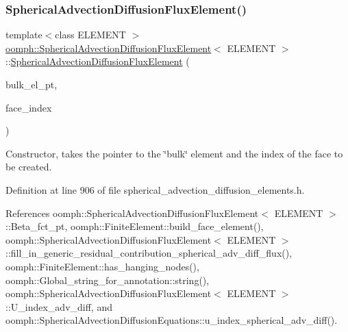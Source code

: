 \subsubsection{\texorpdfstring{Spherical\+Advection\+Diffusion\+Flux\+Element()}{SphericalAdvectionDiffusionFluxElement()}\hspace{0.1cm}{\footnotesize\ttfamily [1/3]}}
{\footnotesize\ttfamily template$<$class E\+L\+E\+M\+E\+NT $>$ \\
\hyperlink{classoomph_1_1SphericalAdvectionDiffusionFluxElement}{oomph\+::\+Spherical\+Advection\+Diffusion\+Flux\+Element}$<$ E\+L\+E\+M\+E\+NT $>$\+::\hyperlink{classoomph_1_1SphericalAdvectionDiffusionFluxElement}{Spherical\+Advection\+Diffusion\+Flux\+Element} (\begin{DoxyParamCaption}\item[{\hyperlink{classoomph_1_1FiniteElement}{Finite\+Element} $\ast$const \&}]{bulk\+\_\+el\+\_\+pt,  }\item[{const int \&}]{face\+\_\+index }\end{DoxyParamCaption})}



Constructor, takes the pointer to the \char`\"{}bulk\char`\"{} element and the index of the face to be created. 



Definition at line 906 of file spherical\+\_\+advection\+\_\+diffusion\+\_\+elements.\+h.



References oomph\+::\+Spherical\+Advection\+Diffusion\+Flux\+Element$<$ E\+L\+E\+M\+E\+N\+T $>$\+::\+Beta\+\_\+fct\+\_\+pt, oomph\+::\+Finite\+Element\+::build\+\_\+face\+\_\+element(), oomph\+::\+Spherical\+Advection\+Diffusion\+Flux\+Element$<$ E\+L\+E\+M\+E\+N\+T $>$\+::fill\+\_\+in\+\_\+generic\+\_\+residual\+\_\+contribution\+\_\+spherical\+\_\+adv\+\_\+diff\+\_\+flux(), oomph\+::\+Finite\+Element\+::has\+\_\+hanging\+\_\+nodes(), oomph\+::\+Global\+\_\+string\+\_\+for\+\_\+annotation\+::string(), oomph\+::\+Spherical\+Advection\+Diffusion\+Flux\+Element$<$ E\+L\+E\+M\+E\+N\+T $>$\+::\+U\+\_\+index\+\_\+adv\+\_\+diff, and oomph\+::\+Spherical\+Advection\+Diffusion\+Equations\+::u\+\_\+index\+\_\+spherical\+\_\+adv\+\_\+diff().

\mbox{\label{classoomph_1_1SphericalAdvectionDiffusionFluxElement_afd26b6adc3a9a6402b38a3c15fc16c0a}} 
